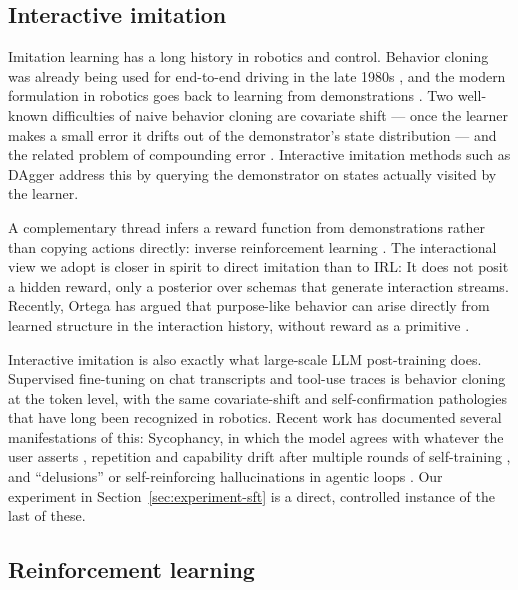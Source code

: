 \documentclass[11pt]{article}
\begin{document}
\subsection{Interactive imitation}
\label{sec:rw-imitation}

Imitation learning has a long history in robotics and control. Behavior cloning was already being used for end-to-end driving in the late 1980s \citep{pomerleau1989alvinn}, and the modern formulation in robotics goes back to learning from demonstrations \citep{schaal1999imitation,argall2009survey}. Two well-known difficulties of naive behavior cloning are covariate shift --- once the learner makes a small error it drifts out of the demonstrator's state distribution --- and the related problem of compounding error \citep{ross2010efficient}. Interactive imitation methods such as DAgger \citep{ross2011dagger} address this by querying the demonstrator on states actually visited by the learner. 

A complementary thread infers a reward function from demonstrations rather than copying actions directly: inverse reinforcement learning \citep{ng2000algorithms,abbeel2004apprenticeship,ziebart2008maxent,ho2016gail}. The interactional view we adopt is closer in spirit to direct imitation than to IRL: It does not posit a hidden reward, only a posterior over schemas that generate interaction streams. Recently, Ortega has argued that purpose-like behavior can arise directly from learned structure in the interaction history, without reward as a primitive \citep{ortega2026universal}. 

Interactive imitation is also exactly what large-scale LLM post-training does. Supervised fine-tuning on chat transcripts and tool-use traces \citep{ouyang2022instructgpt,bai2022training} is behavior cloning at the token level, with the same covariate-shift and self-confirmation pathologies that have long been recognized in robotics. Recent work has documented several manifestations of this: Sycophancy, in which the model agrees with whatever the user asserts \citep{perez2022sycophancy,sharma2023sycophancy}, repetition and capability drift after multiple rounds of self-training \citep{shumailov2024model}, and ``delusions'' or self-reinforcing hallucinations in agentic loops \citep{ortega2021shaking}. Our experiment in Section~\ref{sec:experiment-sft} is a direct, controlled instance of the last of these.

\subsection{Reinforcement learning}
\label{sec:rw-rl}
\end{document}
